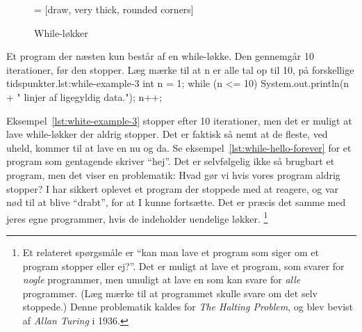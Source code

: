         \begin{figure}
        \center
         = [draw, very thick, rounded corners]
        \caption{While-løkker}
        \label{fig:while-loop-illustrated}
        \end{figure}

		\begin{JavaCode}{Et program der næsten kun består af en while-løkke. Den gennemgår 10 iterationer, før den stopper. Læg mærke til at n er alle tal op til 10, på forskellige tidspunkter.}{lst:while-example-3}
			int n = 1;
			while (n <= 10) {
				System.out.println(n + " linjer af ligegyldig data.");
				n++;
			}
		\end{JavaCode}

        Eksempel~\ref{lst:white-example-3} stopper efter 10
        iterationer, men det er muligt at lave while-løkker der aldrig
        stopper.  Det er faktisk så nemt at de fleste, ved uheld,
        kommer til at lave en nu og da. Se
        eksempel~\ref{lst:while-hello-forever} for et program som
        gentagende skriver ``hej''. Det er selvfølgelig ikke så
        brugbart et program, men det viser en problematik: Hvad gør vi
        hvis vores program aldrig stopper? I har sikkert oplevet et
        program der stoppede med at reagere, og var nød til at blive
        ``drabt'', for at I kunne fortsætte. Det er præcis det samme
        med jeres egne programmer, hvis de indeholder uendelige
        løkker. \footnote{Et relateret spørgsmåle er ``kan man lave et
        program som siger om et program stopper eller ej?''. Det er
        muligt at lave et program, som svarer for \emph{nogle}
        programmer, men umuligt at lave en som kan svare for
        \emph{alle} programmer.  (Læg mærke til at programmet skulle
        svare om det selv stoppede.) Denne problematik kaldes for
        \emph{The Halting Problem}, og blev bevist af \emph{Allan
        Turing} i 1936.}

